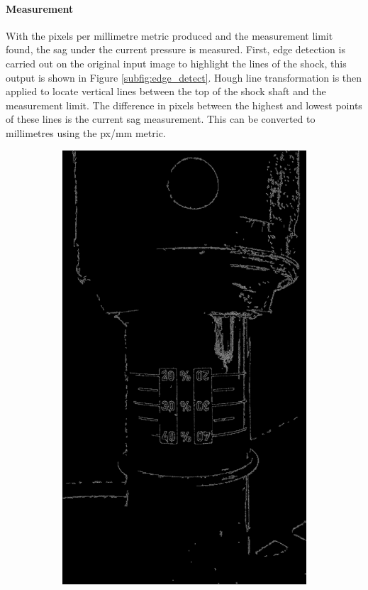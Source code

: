 		\paragraph{Measurement}
			With the pixels per millimetre metric produced and the measurement limit found, the sag under the current pressure is measured. First, edge detection is carried out on the original input image to highlight the lines of the shock, this output is shown in Figure \ref{subfig:edge_detect}. Hough line transformation is then applied to locate vertical lines between the top of the shock shaft and the measurement limit. The difference in pixels between the highest and lowest points of these lines is the current sag measurement. This can be converted to millimetres using the px/mm metric.
		\begin{figure}[h!]
			\centering
			\begin{subfigure}[t]{0.4\textwidth}
				\centering
				\includegraphics[scale=0.04]{../images/results/edged.jpg}

\end{subfigure}
\end{figure}
